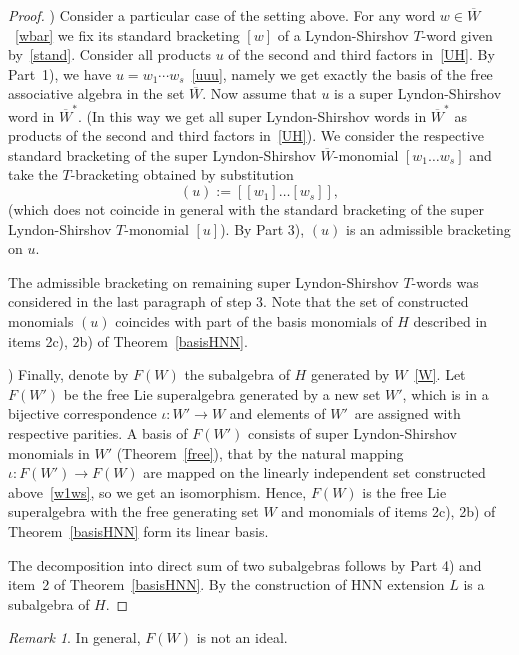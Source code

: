 \documentclass[12pt, reqno]{amsart}
\theoremstyle{remark}
\newtheorem{remark}[theorem]{Remark}
\theoremstyle{definition}
\numberwithin{equation}{section}
\begin{document}
\begin{proof}
) Consider a particular case of the setting above. 
For any word $w\in \overline W$~\eqref{wbar} we fix its standard bracketing $[w]$ of a Lyndon-Shirshov $T$-word given by~\eqref{stand}.
Consider all products $u$ of the second and third factors in~\eqref{UH}.
By Part~1), we have $u=w_1\cdots w_s$~\eqref{uuu}, namely we get exactly the basis of the free associative algebra in the set $\overline W$. 
Now assume that $u$ is a super Lyndon-Shirshov word in $\overline W^*$. 
(In this way we get all super Lyndon-Shirshov words 
 in $\overline W^*$ as products of the second and third factors in~\eqref{UH}). 
We consider the respective standard bracketing of the super Lyndon-Shirshov $\overline W$-monomial  $[w_1 \ldots w_s]$ and take the $T$-bracketing obtained by substitution
\begin{equation}\label{w1ws}
(u):=  [[w_1]\ldots [w_s]], 
\end{equation} 
(which does not coincide in general with the standard bracketing of the super Lyndon-Shirshov $T$-monomial $[u]$).
By Part 3), $(u)$ is an admissible bracketing on $u$.

The admissible bracketing on remaining super Lyndon-Shirshov $T$-words  was considered in the last paragraph of step 3. Note that 
the set of constructed monomials $(u)$ coincides with part of the basis monomials of $H$ described in  items   2c), 2b) of Theorem~\ref{basisHNN}.   

) Finally, denote by $F(W)$ the subalgebra of $H$ generated by $W$~\eqref{W}.
Let $F(W')$ be the free Lie superalgebra generated by a new set $W'$, which is in a bijective correspondence $\iota:W'\to W$ and elements of $W'$~are assigned with respective parities. 
A basis of $F(W')$ consists of super Lyndon-Shirshov monomials in $W'$ (Theorem~\ref{free}),
that by the natural mapping $\iota:F(W')\to F(W)$ are mapped on the  linearly independent set constructed above~\eqref{w1ws}, so we get an isomorphism.
Hence, $F(W)$ is the free Lie superalgebra with the free generating set $W$ and monomials of  items  2c), 2b) of Theorem~\ref{basisHNN} form its  linear   basis.

The decomposition into direct sum of two subalgebras follows by Part 4) and  item~2 of Theorem~\ref{basisHNN}. By the construction of HNN extension $L$  is a subalgebra of $H$.
\end{proof}

\begin{remark} In general, $F(W)$ is not an ideal.
\end{remark}
\end{document}
